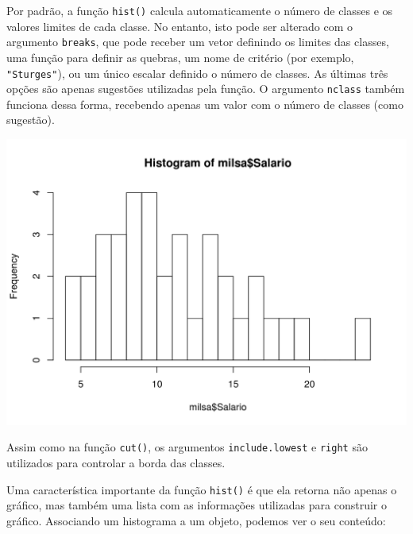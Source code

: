 \documentclass[10pt,a4paper]{book}
\newenvironment{Shaded}{\begin{snugshade}}{\end{snugshade}}
\newcommand{\KeywordTok}[1]{\textcolor[rgb]{0.13,0.29,0.53}{\textbf{#1}}}
\newcommand{\DataTypeTok}[1]{\textcolor[rgb]{0.13,0.29,0.53}{#1}}
\newcommand{\DecValTok}[1]{\textcolor[rgb]{0.00,0.00,0.81}{#1}}
\newcommand{\StringTok}[1]{\textcolor[rgb]{0.31,0.60,0.02}{#1}}
\newcommand{\OperatorTok}[1]{\textcolor[rgb]{0.81,0.36,0.00}{\textbf{#1}}}
\newcommand{\NormalTok}[1]{#1}
\begin{document}
Por padrão, a função \texttt{hist()} calcula automaticamente o número de
classes e os valores limites de cada classe. No entanto, isto pode ser
alterado com o argumento \texttt{breaks}, que pode receber um vetor
definindo os limites das classes, uma função para definir as quebras, um
nome de critério (por exemplo, \texttt{"Sturges"}), ou um único escalar
definido o número de classes. As últimas três opções são apenas
sugestões utilizadas pela função. O argumento \texttt{nclass} também
funciona dessa forma, recebendo apenas um valor com o número de classes
(como sugestão).

\begin{Shaded}
\end{Shaded}

\begin{center}\includegraphics{figures/unnamed-chunk-309-1} \end{center}

Assim como na função \texttt{cut()}, os argumentos
\texttt{include.lowest} e \texttt{right} são utilizados para controlar a
borda das classes.

Uma característica importante da função \texttt{hist()} é que ela
retorna não apenas o gráfico, mas também uma lista com as informações
utilizadas para construir o gráfico. Associando um histograma a um
objeto, podemos ver o seu conteúdo:

\begin{Shaded}
\end{Shaded}
\end{document}
